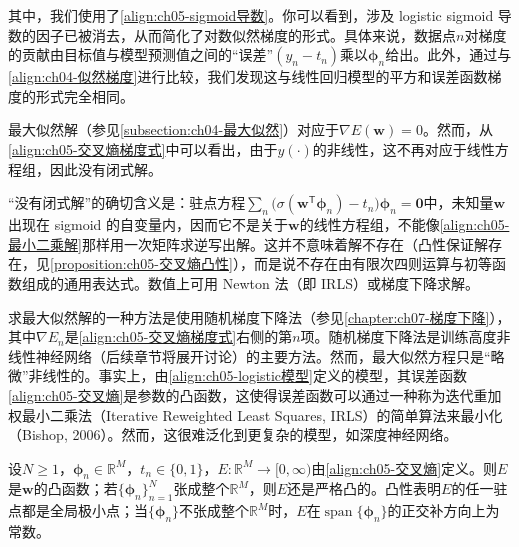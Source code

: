 \documentclass[../../main.tex]{subfiles}
\begin{document}
其中，我们使用了\eqref{align:ch05-sigmoid导数}。你可以看到，涉及 logistic sigmoid 导数的因子已被消去，从而简化了对数似然梯度的形式。具体来说，数据点$n$对梯度的贡献由目标值与模型预测值之间的“误差”$(y_n-t_n)$乘以$\boldsymbol{\phi}_n$给出。此外，通过与\cref{align:ch04-似然梯度}进行比较，我们发现这与线性回归模型的平方和误差函数梯度的形式完全相同。

最大似然解（参见\cref{subsection:ch04-最大似然}）对应于$\nabla E(\boldsymbol{w})=0$。然而，从\eqref{align:ch05-交叉熵梯度式}中可以看出，由于$y(\cdot)$的非线性，这不再对应于线性方程组，因此没有闭式解。

\begin{remark}
“没有闭式解”的确切含义是：驻点方程$\sum_n\bigl(\sigma(\boldsymbol{w}^{\mathsf{T}}\boldsymbol{\phi}_n)-t_n\bigr)\boldsymbol{\phi}_n=\boldsymbol{0}$中，未知量$\boldsymbol{w}$出现在 sigmoid 的自变量内，因而它不是关于$\boldsymbol{w}$的线性方程组，不能像\eqref{align:ch05-最小二乘解}那样用一次矩阵求逆写出解。这并不意味着解不存在（凸性保证解存在，见\cref{proposition:ch05-交叉熵凸性}），而是说不存在由有限次四则运算与初等函数组成的通用表达式。数值上可用 Newton 法（即 IRLS）或梯度下降求解。
\end{remark}

求最大似然解的一种方法是使用随机梯度下降法（参见\cref{chapter:ch07-梯度下降}），其中$\nabla E_n$是\eqref{align:ch05-交叉熵梯度式}右侧的第$n$项。随机梯度下降法是训练高度非线性神经网络（后续章节将展开讨论）的主要方法。然而，最大似然方程只是“略微”非线性的。事实上，由\eqref{align:ch05-logistic模型}定义的模型，其误差函数\eqref{align:ch05-交叉熵}是参数的凸函数，这使得误差函数可以通过一种称为迭代重加权最小二乘法（Iterative Reweighted Least Squares, IRLS）的简单算法来最小化（Bishop, 2006）。然而，这很难泛化到更复杂的模型，如深度神经网络。

\begin{proposition}[交叉熵误差的凸性]\label{proposition:ch05-交叉熵凸性}
设$N\geqslant1$，$\boldsymbol{\phi}_n\in\mathbb{R}^{M}$，$t_n\in\{0,1\}$，$E:\mathbb{R}^{M}\to[0,\infty)$由\eqref{align:ch05-交叉熵}定义。则$E$是$\boldsymbol{w}$的凸函数；若$\{\boldsymbol{\phi}_n\}_{n=1}^{N}$张成整个$\mathbb{R}^{M}$，则$E$还是严格凸的。凸性表明$E$的任一驻点都是全局极小点；当$\{\boldsymbol{\phi}_n\}$不张成整个$\mathbb{R}^{M}$时，$E$在$\operatorname{span}\{\boldsymbol{\phi}_n\}$的正交补方向上为常数。
\end{proposition}
\end{document}
